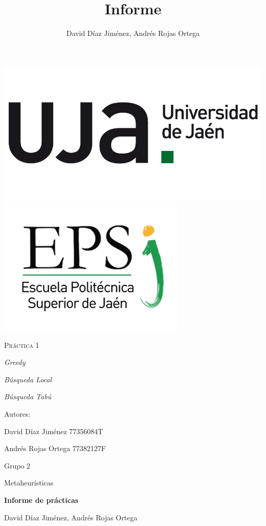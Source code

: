 \documentclass{article}
\title{Informe}
\author{David Díaz Jiménez, Andrés Rojas Ortega}
\begin{document}
	
	\begin{titlepage}
		\centering
		{\includegraphics[scale=0.2]{img/np_UJA_generica_6.png}
		\includegraphics[scale=0.35]{img/Logo_EPS.png}}
		\vspace{1cm}
		{\scshape\Huge Práctica 1 \par}
		\vspace{3cm}
		{\itshape\Large Greedy \par}
		{\itshape\Large Búsqueda Local \par}
		{\itshape\Large Búsqueda Tabú \par}
		\vfill
		{\Large Autores: \par}
		{\Large David Díaz Jiménez 77356084T \par}
		{\Large Andrés Rojas Ortega 77382127F\par}
		\vfill
		{\Large Grupo 2 \par}
	\end{titlepage}
	
	\begin{center}
		
		\begin{large}
			
			Metaheurísticas
			
		\end{large}
		
		\vspace*{0.2in}
		\textbf{\large Informe de prácticas}
		
		\vspace*{.2in}
		
		David Díaz Jiménez, Andrés Rojas Ortega
		
		\vspace*{2.5cm}
		
	\end{center}
	
\end{document}
